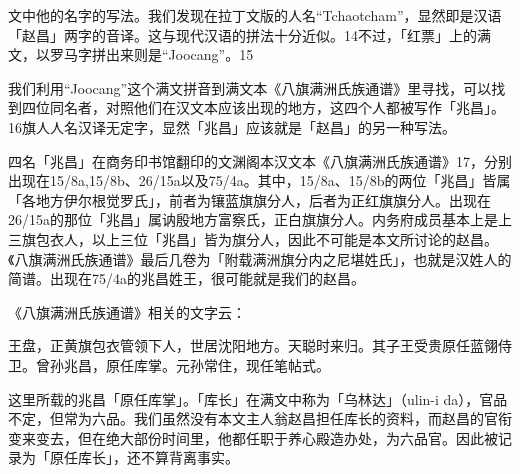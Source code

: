 \vfill
\begin{BookNotes}
\end{BookNotes}

\noindent 文中他的名字的写法。我们发现在拉丁文版的人名“Tchaotcham”，显然即是汉语「赵昌」两字的音译。这与现代汉语的拼法十分近似。14不过，「红票」上的满文，以罗马字拼出来则是“Joocang”。15

我们利用“Joocang”这个满文拼音到满文本《八旗满洲氏族通谱》里寻找，可以找到四位同名者，对照他们在汉文本应该出现的地方，这四个人都被写作「兆昌」。16旗人人名汉译无定字，显然「兆昌」应该就是「赵昌」的另一种写法。

四名「兆昌」在商务印书馆翻印的文渊阁本汉文本《八旗满洲氏族通谱》17，分别出现在15/8a,15/8b、26/15a以及75/4a。其中，15/8a、15/8b的两位「兆昌」皆属「各地方伊尔根觉罗氏」，前者为镶蓝旗旗分人，后者为正红旗旗分人。出现在26/15a的那位「兆昌」属讷殷地方富察氏，正白旗旗分人。内务府成员基本上是上三旗包衣人，以上三位「兆昌」皆为旗分人，因此不可能是本文所讨论的赵昌。《八旗满洲氏族通谱》最后几卷为「附载满洲旗分内之尼堪姓氏」，也就是汉姓人的简谱。出现在75/4a的兆昌姓王，很可能就是我们的赵昌。

\begin{BookQuote}
《八旗满洲氏族通谱》相关的文字云：
\end{BookQuote}

\begin{BookQuote}
王盘，正黄旗包衣管领下人，世居沈阳地方。天聪时来归。其子王受贵原任蓝翎侍卫。曾孙兆昌，原任库掌。元孙常住，现任笔帖式。
\end{BookQuote}

这里所载的兆昌「原任库掌」。「库长」在满文中称为「乌林达」（ulin-i da），官品不定，但常为六品。我们虽然没有本文主人翁赵昌担任库长的资料，而赵昌的官衔变来变去，但在绝大部份时间里，他都任职于养心殿造办处，为六品官。因此被记录为「原任库长」，还不算背离事实。

